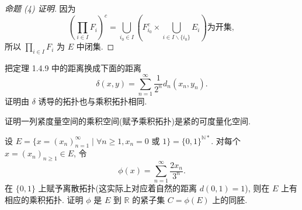 \begin{proof}[命题 (4) 证明]
因为
\[\left(\prod_{i\in I}F_i\right)^c=\bigcup_{i_0\in I}\left(F_{i_0}^c\times\bigcup_{i\in I\backslash\{i_0\}}E_i\right)\text{为开集},\]
所以 $\prod_{i\in I}F_i$ 为 $E$ 中闭集.
\end{proof}


\begin{exercise}
    把定理 1.4.9 中的距离换成下面的距离
    \[\delta(x,y)=\sum_{n=1}^{\infty}\frac{1}{2^n}d_n(x_n,y_n).\]
    证明由 $\delta$ 诱导的拓扑也与乘积拓扑相同.
\end{exercise}


\begin{exercise}
    证明一列紧度量空间的乘积空间(赋予乘积拓扑)是紧的可度量化空间.
\end{exercise}


\begin{exercise}
  设 $E=\{x=(x_n)_{n=1}^{\infty}\mid \forall n\geq 1,
  x_n=0\text{\ 或\ }1\}=\{0,1\}^{\mathbb{N}*}$.
  对每个 $x=(x_n)_{n\geq 1}\in E$, 令
  \[\phi(x)=\sum_{n=1}^{\infty}\frac{2x_n}{3^n}.\]
  在 $\{0,1\}$ 上赋予离散拓扑(这实际上对应着自然的距离 $d(0,1)=1$), 则在 $E$
  上有相应的乘积拓扑. 证明 $\phi$ 是 $E$ 到 $\mathbb{R}$ 的紧子集 $C=\phi(E)$ 上的同胚.
\end{exercise}